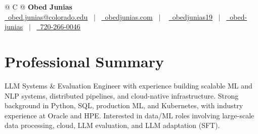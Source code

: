 \documentclass[a4paper,11pt]{article}
\begin{document}
\pagestyle{empty} 



\begin{tabularx}{\linewidth}{@{} C @{}}
  \Huge {\textbf{Obed Junias} }\\[1pt]
  \href{mailto:obed.junias@colorado.edu}{\raisebox{-0.05\height}\faEnvelope \ obed.junias@colorado.edu} \ $|$ \
  \href{https://obedjunias.github.io}{\raisebox{-0.05\height}\faGlobe\ obedjunias.com} \ $|$ \
  \href{https://github.com/obedjunias19}{\raisebox{-0.05\height}\faGithub \ obedjunias19} \ $|$ \
  \href{https://linkedin.com/in/obed-junias}{\raisebox{-0.05\height}\faLinkedin\ obed-junias} \ $|$ \
  \href{tel:+1720-266-0046}{\raisebox{-0.05\height}\faMobile \ 720-266-0046} \\
\end{tabularx}


\color{BlueViolet}
\section*{Professional Summary}
\color{black}
LLM Systems \& Evaluation Engineer with experience building scalable ML and NLP systems, distributed pipelines, and cloud-native infrastructure. Strong background in Python, SQL, production ML, and Kubernetes, with industry experience at Oracle and HPE. Interested in data/ML roles involving large-scale data processing, cloud, LLM evaluation, and LLM adaptation (SFT).

\color{BlueViolet}
\end{document}
